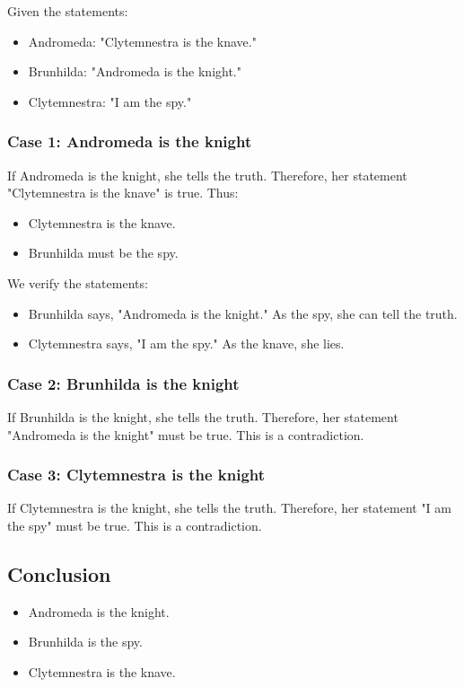 \documentclass{article}
\begin{document}
Given the statements:
\begin{itemize}
    \item Andromeda: "Clytemnestra is the knave."
    \item Brunhilda: "Andromeda is the knight."
    \item Clytemnestra: "I am the spy."
\end{itemize}
\subsubsection*{Case 1: Andromeda is the knight}
If Andromeda is the knight, she tells the truth. Therefore, her statement "Clytemnestra is the knave" is true. Thus:
\begin{itemize}
    \item Clytemnestra is the knave.
    \item Brunhilda must be the spy.
\end{itemize}
We verify the statements:
\begin{itemize}
    \item Brunhilda says, "Andromeda is the knight." As the spy, she can tell the truth.
    \item Clytemnestra says, "I am the spy." As the knave, she lies.
\end{itemize}

\subsubsection*{Case 2: Brunhilda is the knight}
If Brunhilda is the knight, she tells the truth. Therefore, her statement "Andromeda is the knight" must be true. This is a contradiction.

\subsubsection*{Case 3: Clytemnestra is the knight}
If Clytemnestra is the knight, she tells the truth. Therefore, her statement "I am the spy" must be true. This is a contradiction.

\subsection*{Conclusion}
\begin{itemize}
    \item Andromeda is the knight.
    \item Brunhilda is the spy.
    \item Clytemnestra is the knave.
\end{itemize}
\end{document}
